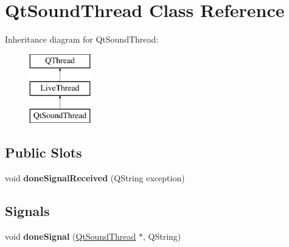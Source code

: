\hypertarget{classQtSoundThread}{\section{Qt\+Sound\+Thread Class Reference}
\label{classQtSoundThread}
}
Inheritance diagram for Qt\+Sound\+Thread\+:\begin{figure}[H]
\begin{center}
\leavevmode
\includegraphics[height=3.000000cm]{classQtSoundThread}
\end{center}
\end{figure}
\subsection*{Public Slots}
\begin{DoxyCompactItemize}
\item 
\hypertarget{classQtSoundThread_a57899ed97f7d2d1d5dcc4fa49dd5ff7e}{void {\bfseries done\+Signal\+Received} (Q\+String exception)}\label{classQtSoundThread_a57899ed97f7d2d1d5dcc4fa49dd5ff7e}

\end{DoxyCompactItemize}
\subsection*{Signals}
\begin{DoxyCompactItemize}
\item 
\hypertarget{classQtSoundThread_af32283e8f2e3482e98796880715e779e}{void {\bfseries done\+Signal} (\hyperlink{classQtSoundThread}{Qt\+Sound\+Thread} $\ast$, Q\+String)}\label{classQtSoundThread_af32283e8f2e3482e98796880715e779e}

\end{DoxyCompactItemize}
